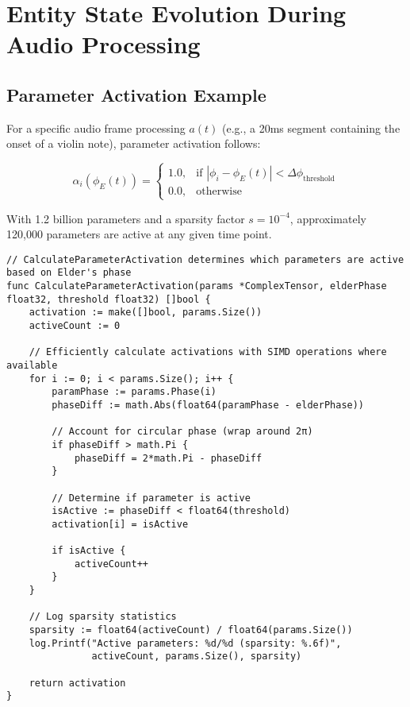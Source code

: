 \section{Entity State Evolution During Audio Processing}

\subsection{Parameter Activation Example}

For a specific audio frame processing $a(t)$ (e.g., a 20ms segment containing the onset of a violin note), parameter activation follows:

\begin{equation}
\alpha_i(\phi_E(t)) = \begin{cases}
1.0, & \text{if } |\phi_i - \phi_E(t)| < \Delta\phi_{\text{threshold}} \\
0.0, & \text{otherwise}
\end{cases}
\end{equation}

With 1.2 billion parameters and a sparsity factor $s = 10^{-4}$, approximately 120,000 parameters are active at any given time point. 

\begin{tcolorbox}[colback=CodeBackground, colframe=DarkGray, title=Parameter Activation Function in Go, fonttitle=\bfseries]
\begin{verbatim}
// CalculateParameterActivation determines which parameters are active based on Elder's phase
func CalculateParameterActivation(params *ComplexTensor, elderPhase float32, threshold float32) []bool {
    activation := make([]bool, params.Size())
    activeCount := 0
    
    // Efficiently calculate activations with SIMD operations where available
    for i := 0; i < params.Size(); i++ {
        paramPhase := params.Phase(i)
        phaseDiff := math.Abs(float64(paramPhase - elderPhase))
        
        // Account for circular phase (wrap around 2π)
        if phaseDiff > math.Pi {
            phaseDiff = 2*math.Pi - phaseDiff
        }
        
        // Determine if parameter is active
        isActive := phaseDiff < float64(threshold)
        activation[i] = isActive
        
        if isActive {
            activeCount++
        }
    }
    
    // Log sparsity statistics
    sparsity := float64(activeCount) / float64(params.Size())
    log.Printf("Active parameters: %d/%d (sparsity: %.6f)", 
               activeCount, params.Size(), sparsity)
    
    return activation
}
\end{verbatim}
\end{tcolorbox}

